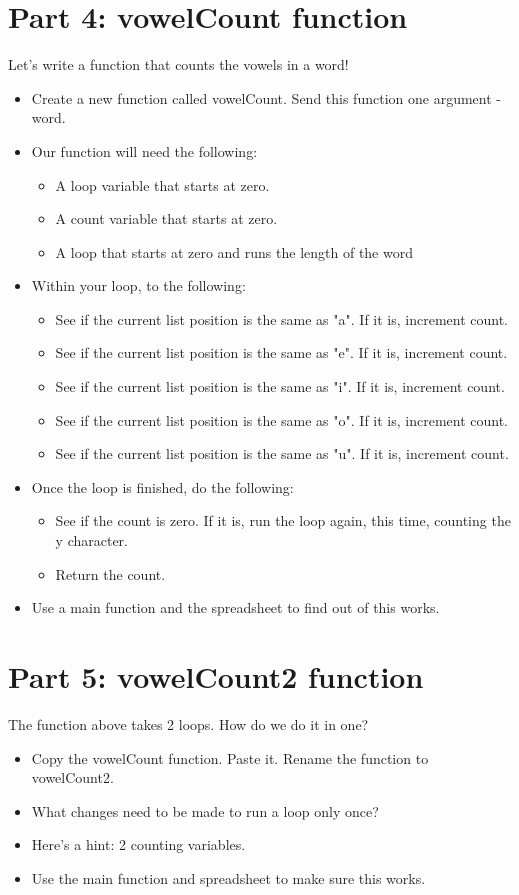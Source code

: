 \documentclass{article}
\begin{document}
\section*{Part 4: vowelCount function}
Let's write a function that counts the vowels in a word!
\begin{itemize}
    \item Create a new function called vowelCount.  Send this function one argument - word.
    \item Our function will need the following:
    \begin{itemize}
    		\item A loop variable that starts at zero.
    		\item A count variable that starts at zero.
    		\item A loop that starts at zero and runs the length of the word
    	\end{itemize}
    	\item Within your loop, to the following:
    	\begin{itemize}
    		\item See if the current list position is the same as "a".  If it is, increment count.
    		\item See if the current list position is the same as "e".  If it is, increment count.
    		\item See if the current list position is the same as "i".  If it is, increment count.
    		\item See if the current list position is the same as "o".  If it is, increment count.
    		\item See if the current list position is the same as "u".  If it is, increment count.
    	\end{itemize}
    	\item Once the loop is finished, do the following:
    	\begin{itemize}
    		\item See if the count is zero.  If it is, run the loop again, this time, counting the y character.
    		\item Return the count.
    	\end{itemize}
    	\item Use a main function and the spreadsheet to find out of this works.
\end{itemize}

\section*{Part 5: vowelCount2 function}
The function above takes 2 loops.  How do we do it in one?
\begin{itemize}
    \item Copy the vowelCount function.  Paste it.  Rename the function to vowelCount2.
    \item What changes need to be made to run a loop only once?
    \item Here's a hint:  2 counting variables.
    \item Use the main function and spreadsheet to make sure this works.
\end{itemize}
\end{document}
